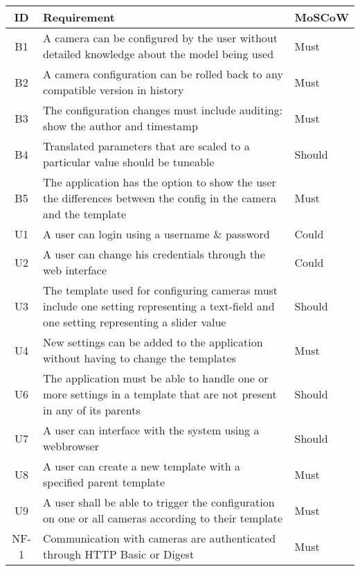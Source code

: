 \begin{table*}[h]
    \centering
    \begin{tabulary}{\linewidth}{CLL}
        \textbf{ID} & \textbf{Requirement} & \textbf{MoSCoW}
        \\ \hline %
        B1 & A camera can be configured by the user without detailed knowledge about the model being used & Must
        \\ \hline
        B2 & A camera configuration can be rolled back to any compatible version in history & Must
        \\ \hline
        B3 & The configuration changes must include auditing: show the author and timestamp & Must
        \\ \hline
        B4 & Translated parameters that are scaled to a particular value should be tuneable & Should
        \\ \hline
        B5 & The application has the option to show the user the differences between the config in the camera and the template & Must
        \\ \hline
        U1 & A user can login using a username \& password & Could
        \\ \hline
        U2 & A user can change his credentials through the web interface & Could
        \\ \hline
        U3 & The template used for configuring cameras must include one setting representing a text-field and one setting representing a slider value & Should
        \\ \hline
        U4 & New settings can be added to the application without having to change the templates & Must
        \\ \hline
        U6 & The application must be able to handle one or more settings in a template that are not present in any of its parents & Should
        \\ \hline
        U7 & A user can interface with the system using a webbrowser & Should
        \\ \hline
        U8 & A user can create a new template with a specified parent template & Must
        \\ \hline
        U9 & A user shall be able to trigger the configuration on one or all cameras according to their template & Must
        \\ \hline
        NF-1 & Communication with cameras are authenticated through HTTP Basic or Digest & Must

\end{tabulary}
\end{table*}
